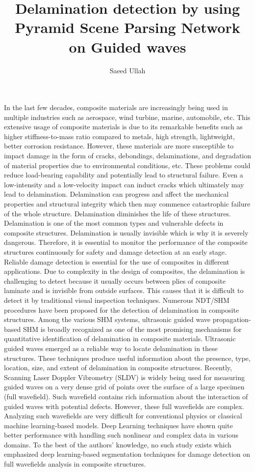 \documentclass[11pt,a4paper]{article}
\title{Delamination detection by using Pyramid Scene Parsing Network on Guided waves}
\author{Saeed Ullah}
\begin{document}
	\maketitle
In the last few decades, composite materials are increasingly being used in multiple industries such as aerospace, wind turbine, marine, automobile, etc. This extensive usage of composite materials is due to its remarkable benefits such as higher stiffness-to-mass ratio compared to metals, high strength, lightweight, better corrosion resistance. However, these materials are more susceptible to impact damage in the form of cracks, debondings, delaminations, and degradation of material properties due to environmental conditions, etc. These problems could reduce load-bearing capability and potentially lead to structural failure. Even a low-intensity and a low-velocity impact can induct cracks which ultimately may lead to delamination. Delamination can progress and affect the mechanical properties and structural integrity which then may commence catastrophic failure of the whole structure. Delamination diminishes the life of these structures. Delamination is one of the most common types and vulnerable defects in composite structures. Delamination is usually invisible which is why it is severely dangerous. Therefore, it is essential to monitor the performance of the composite structures continuously for safety and damage detection at an early stage. Reliable damage detection is essential for the use of composites in different applications.
Due to complexity in the design of composites, the delamination is challenging to detect because it usually occurs between plies of composite laminate and is invisible from outside surfaces. This causes that it is difficult to detect it by traditional visual inspection techniques.
Numerous NDT/SHM procedures have been proposed for the detection of delamination in composite structures. Among the various SHM systems, ultrasonic guided wave propagation-based SHM is broadly recognized as one of the most promising mechanisms for quantitative identification of delamination in composite materials. Ultrasonic guided waves emerged as a reliable way to locate delamination in these structures. These techniques produce useful information about the presence, type, location, size, and extent of delamination in composite structures.
Recently, Scanning Laser Doppler Vibrometry (SLDV) is widely being used for measuring guided waves on a very dense grid of points over the surface of a large specimen (full wavefield). Such wavefield contains rich information about the interaction of guided waves with potential defects. However, these full wavefields are complex. Analyzing such wavefields are very difficult for conventional physics or classical machine learning-based models. Deep Learning techniques have shown quite better performance with handling such nonlinear and complex data in various domains. To the best of the authors' knowledge, no such study exists which emphasized deep learning-based segmentation techniques for damage detection on full wavefields analysis in composite structures.
\end{document}
